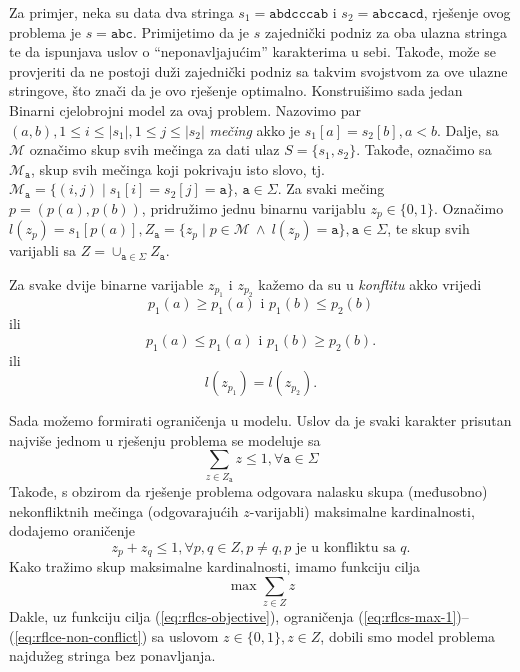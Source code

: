 \documentclass[a4paper, utf8, 11pt, colorlinks]{book}
\begin{document}
Za primjer, neka su data dva stringa $s_1 = \texttt{abdcccab}$ i $s_2=\texttt{abccacd}$, rješenje ovog problema je $s=\texttt{abc}$. Primijetimo da je $s$ zajednički podniz za oba ulazna stringa te da ispunjava uslov o ``neponavljajućim'' karakterima u sebi. Takođe, može se provjeriti da ne postoji duži zajednički podniz sa takvim svojstvom za ove ulazne stringove, što znači da je ovo rješenje optimalno. Konstruišimo sada jedan Binarni cjelobrojni model za ovaj problem. Nazovimo par $(a, b), 1 \leq i \leq |s_1|, 1 \leq j \leq |s_2|$ \emph{mečing} akko je $s_1[a]=s_2[b], a < b$. Dalje, sa $\mathcal{M}$ označimo skup svih mečinga za dati ulaz $S=\{s_1, s_2\}$. Takođe, označimo sa  $\mathcal{M}_{\texttt{a}}$, skup svih mečinga koji pokrivaju isto slovo, tj. 
$\mathcal{M}_{\texttt{a}} = \{ (i, j) \mid s_1[i]=s_2[j]=\texttt{a}\}$, $\texttt{a} \in \Sigma$. Za svaki mečing $p=(p(a),p(b))$, pridružimo jednu binarnu varijablu $z_{p} \in \{0, 1\}$. Označimo $l(z_p)= s_1[ p(a) ], Z_{\texttt{a}} = \{ z_p \mid p \in \mathcal{M} \ \wedge\  l(z_p) = \texttt{a}\}, \texttt{a}\in \Sigma$, te skup svih varijabli sa $Z = \cup_{\texttt{a} \in \Sigma} Z_{\texttt{a}}$. 

Za svake dvije binarne varijable $z_{p_1}$ i $z_{p_2}$ kažemo da su u \emph{konflitu} akko vrijedi $$ p_1(a) \geq p_1(a) \mbox{ i } p_1(b) \leq p_2(b)     $$ 
ili 
 $$ p_1(a) \leq p_1(a) \mbox{ i } p_1(b) \geq p_2(b).$$ 
ili 
$$ l(z_{p_1}) = l(z_{p_2}).$$

Sada možemo formirati ograničenja u modelu. Uslov da je svaki karakter prisutan najviše jednom u rješenju problema se modeluje sa 
\begin{equation}\label{eq:rflcs-max-1}
	 \sum_{z \in  Z_{\texttt{a} }} z \leq 1, \forall \texttt{a} \in \Sigma 
\end{equation}
Takođe, s obzirom da rješenje problema odgovara nalasku skupa (međusobno) nekonfliktnih mečinga (odgovarajućih $z$-varijabli) maksimalne kardinalnosti, dodajemo oraničenje
\begin{equation}\label{eq:rflce-non-conflict}
	 z_{p} + z_q \leq 1, \forall p,q \in Z, p\neq q, p\mbox{ je u konfliktu sa } q.
\end{equation}
Kako tražimo skup maksimalne kardinalnosti, imamo funkciju cilja 
\begin{equation}\label{eq:rflcs-objective}
	 \max \sum_{z \in Z } z 
\end{equation}
Dakle, uz funkciju cilja (\ref{eq:rflcs-objective}), ograničenja (\ref{eq:rflcs-max-1})--(\ref{eq:rflce-non-conflict}) sa uslovom $z \in \{0, 1\}, z \in Z$, dobili smo model problema najdužeg stringa bez ponavljanja. 
\end{document}
